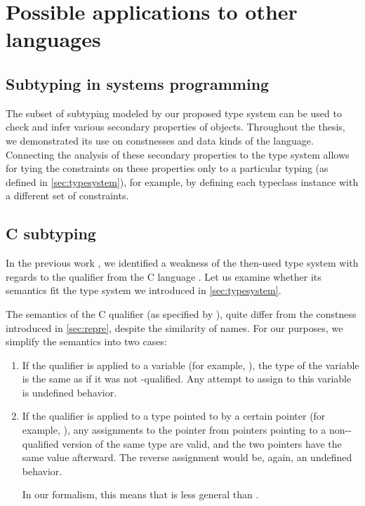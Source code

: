 \section{Possible applications to other languages}

\subsection{Subtyping in systems programming}

The subset of subtyping modeled by our proposed type system can be used to check and infer various secondary properties of objects. Throughout the thesis, we demonstrated its use on constnesses and data kinds of the \cmm language. Connecting the analysis of these secondary properties to the type system allows for tying the constraints on these properties only to a particular typing (as defined in \cref{sec:typesystem}), for example, by defining each typeclass instance with a different set of constraints.

\subsection{C subtyping}

In the previous work \cite{klepl2020type}, we identified a weakness of the then-used type system with regards to the  qualifier from the C language \cite{cstandard2018}. Let us examine whether its semantics fit the type system we introduced in \cref{sec:typesystem}.

The semantics of the C  qualifier (as specified by \cite{cstandard2018}), quite differ from the constness introduced in \cref{sec:repre}, despite the similarity of names. For our purposes, we simplify the semantics into two cases:

\begin{enumerate}
    \item If the  qualifier is applied to a variable (for example, ), the type of the variable is the same as if it was not -qualified. Any attempt to assign to this variable is undefined behavior. \label{constvar}

    \item If the  qualifier is applied to a type pointed to by a certain pointer (for example, ), any assignments to the pointer from pointers pointing to a non--qualified version of the same type are valid, and the two pointers have the same value afterward. The reverse assignment would be, again, an undefined behavior. \label{pointerSubtype}

    In our formalism, this means that  is less general than .
\end{enumerate}


